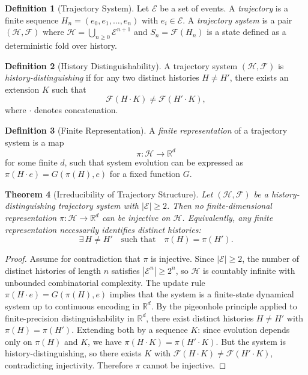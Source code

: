 \documentclass[12pt, twoside]{article}
\theoremstyle{plain}
\newtheorem{theorem}{Theorem}[section]
\theoremstyle{definition}
\newtheorem{definition}[theorem]{Definition}
\theoremstyle{remark}
\begin{document}
\begin{definition}[Trajectory System]
Let $\mathcal{E}$ be a set of events.
A \emph{trajectory} is a finite sequence
$H_n = (e_0, e_1, \dots, e_n)$ with $e_i \in \mathcal{E}$.
A \emph{trajectory system} is a pair $(\mathcal{H}, \mathcal{F})$
where $\mathcal{H} = \bigcup_{n \geq 0} \mathcal{E}^{n+1}$ and
$S_n = \mathcal{F}(H_n)$ is a state defined as a deterministic
fold over history.
\end{definition}

\begin{definition}[History Distinguishability]
A trajectory system $(\mathcal{H}, \mathcal{F})$ is
\emph{history-distinguishing} if for any two distinct histories
$H \neq H'$, there exists an extension $K$ such that
\[
  \mathcal{F}(H \cdot K) \neq \mathcal{F}(H' \cdot K),
\]
where $\cdot$ denotes concatenation.
\end{definition}

\begin{definition}[Finite Representation]
A \emph{finite representation} of a trajectory system is a map
\[
  \pi : \mathcal{H} \to \mathbb{R}^d
\]
for some finite $d$, such that system evolution can be expressed as
$\pi(H \cdot e) = G(\pi(H), e)$ for a fixed function $G$.
\end{definition}

\begin{theorem}[Irreducibility of Trajectory Structure]
\label{thm:irreducibility}
Let $(\mathcal{H}, \mathcal{F})$ be a history-distinguishing
trajectory system with $|\mathcal{E}| \geq 2$.
Then no finite-dimensional representation
$\pi: \mathcal{H} \to \mathbb{R}^d$ can be injective on $\mathcal{H}$.
Equivalently, any finite representation necessarily identifies
distinct histories:
\[
  \exists\, H \neq H' \quad \text{such that} \quad \pi(H) = \pi(H').
\]
\end{theorem}

\begin{proof}
Assume for contradiction that $\pi$ is injective.
Since $|\mathcal{E}| \geq 2$, the number of distinct histories of
length $n$ satisfies $|\mathcal{E}^n| \geq 2^n$, so $\mathcal{H}$
is countably infinite with unbounded combinatorial complexity.
The update rule $\pi(H \cdot e) = G(\pi(H), e)$ implies that
the system is a finite-state dynamical system up to continuous
encoding in $\mathbb{R}^d$.
By the pigeonhole principle applied to finite-precision
distinguishability in $\mathbb{R}^d$, there exist distinct
histories $H \neq H'$ with $\pi(H) = \pi(H')$.
Extending both by a sequence $K$: since evolution depends only
on $\pi(H)$ and $K$, we have $\pi(H \cdot K) = \pi(H' \cdot K)$.
But the system is history-distinguishing, so there exists $K$
with $\mathcal{F}(H \cdot K) \neq \mathcal{F}(H' \cdot K)$,
contradicting injectivity.
Therefore $\pi$ cannot be injective.
\end{proof}
\end{document}
